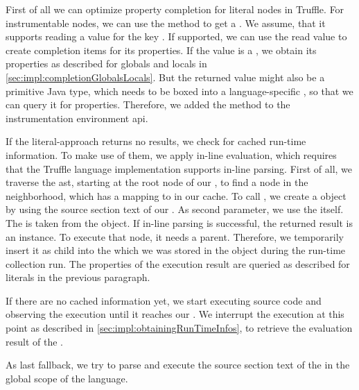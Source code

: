     First of all we can optimize property completion for literal nodes in Truffle. For instrumentable nodes, we can use the method  to get a . We assume, that it supports reading a value for the key . If supported, we can use the read value to create completion items for its properties. If the value is a , we obtain its properties as described for globals and locals in \autoref{sec:impl:completionGlobalsLocals}. But the returned value might also be a primitive Java type, which needs to be boxed into a language-specific , so that we can query it for properties. Therefore, we added the method  to the instrumentation environment \ac{api}.

    If the literal-approach returns no results, we check for cached run-time information. To make use of them, we apply in-line evaluation, which requires that the Truffle language implementation supports in-line parsing. First of all, we traverse the \ac{ast}, starting at the root node of our , to find a node in the neighborhood, which has a mapping to  in our cache. To call , we create a  object by using the source section text of our . As second parameter, we use the  itself. The  is taken from the  object. If in-line parsing is successful, the returned result is an  instance. To execute that node, it needs a parent. Therefore, we temporarily insert it as child into the  which we was stored in the  object during the run-time collection run. The properties of the execution result are queried as described for literals in the previous paragraph.

    If there are no cached information yet, we start executing source code and observing the execution until it reaches our . We interrupt the execution at this point as described in \autoref{sec:impl:obtainingRunTimeInfos}, to retrieve the evaluation result of the .

    As last fallback, we try to parse and execute the source section text of the  in the global scope of the language.

